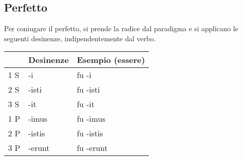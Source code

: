 \subsection{Perfetto}

Per coniugare il perfetto, si prende la radice dal paradigma e si applicano le seguenti desinenze,
indipendentemente dal verbo.

\begin{table}[h!]
     \centering
     \begin{tabular}{|l|l|l|}
        \hline
        & \textbf{Desinenze} & \textbf{Esempio (essere)} \\
        \hline
        1 S & -i     & fu -i     \\
        \hline
        2 S & -isti  & fu -isti  \\
        \hline
        3 S & -it    & fu -it    \\
        \hline
        1 P & -imus  & fu -imus  \\
        \hline
        2 P & -istis & fu -istis \\
        \hline
        3 P & -erunt & fu -erunt \\
        \hline
     \end{tabular}
\end{table}


